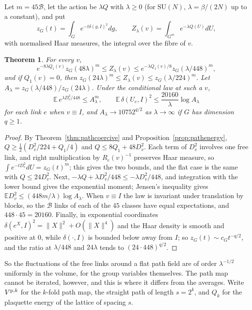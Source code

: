 \documentclass[11pt]{amsart}
\newtheorem{theorem}{Theorem}[section]
\theoremstyle{definition}
\theoremstyle{remark}
\numberwithin{equation}{section}
\newcommand{\E}{\mathbb{E}}
\newcommand{\SU}{\mathrm{SU}}
\begin{document}
Let $m=45\mathcal B$, let the action be $\lambda Q$ with $\lambda\ge0$
(for $\SU(N)$, $\lambda=\beta/(2N)$ up to a constant), and put
\[
z_G(t)=\int_Ge^{-t\delta(g,I)^2}dg,\qquad Z_\lambda(v)=\int_{G^m}
e^{-\lambda Q(U)}dU,
\]
with normalised Haar measures, the integral over the fibre of $v$.

\begin{theorem}\label{thm:pathZ}
For every $v$,
\[
e^{-8\lambda Q_1(v)}z_G(48\lambda)^m\le Z_\lambda(v)\le e^{-\lambda
Q_1(v)/8}z_G(\lambda/448)^m,
\]
and if $Q_1(v)=0$, then $z_G(24\lambda)^m\le Z_\lambda(v)\le z_G(\lambda/
224)^m$. Let $A_\lambda=z_G(\lambda/448)/z_G(24\lambda)$. Under the
conditional law at such a $v$,
\[
\E\,e^{\lambda D_v^2/448}\le A_\lambda^m,\qquad \E\,\delta(U_e,I)^2\le
\frac{20160}\lambda\log A_\lambda
\]
for each link $e$ when $v\equiv I$, and $A_\lambda\to10752^{q/2}$ as
$\lambda\to\infty$ if $G$ has dimension $q\ge1$.
\end{theorem}

\begin{proof}
By Theorem~\ref{thm:pathcoercive} and Proposition~\ref{prop:pathenergy},
$Q\ge\frac12(D_v^2/224+Q_1/4)$ and $Q\le8Q_1+48D_v^2$. Each term of
$D_v^2$ involves one free link, and right multiplication by $R_e(v)^{-1}$
preserves Haar measure, so $\int e^{-tD_v^2}dU=z_G(t)^m$; this gives the
two bounds, and the flat case is the same with $Q\le24D_v^2$. Next,
$-\lambda Q+\lambda D_v^2/448\le-\lambda D_v^2/448$, and integration with
the lower bound gives the exponential moment; Jensen's inequality gives
$\E D_v^2\le(448m/\lambda)\log A_\lambda$. When $v\equiv I$ the law is
invariant under translation by blocks, so the $\mathcal B$ links of each
of the $45$ classes have equal expectations, and $448\cdot45=20160$.
Finally, in exponential coordinates $\delta(e^X,I)^2=\lVert X\rVert^2+
O(\lVert X\rVert^4)$ and the Haar density is smooth and positive at $0$,
while $\delta(\cdot,I)$ is bounded below away from $I$; so $z_G(t)\sim c_G
t^{-q/2}$, and the ratio at $\lambda/448$ and $24\lambda$ tends to
$(24\cdot448)^{q/2}$.
\end{proof}

So the fluctuations of the free links around a flat path field are of
order $\lambda^{-1/2}$ uniformly in the volume, for the group variables
themselves. The path map cannot be iterated, however, and this is where it
differs from the averages. Write $V^{{\rm p},k}$ for the $k$-fold path map,
the straight path of length $s=2^k$, and $Q_k$ for the plaquette energy of
the lattice of spacing $s$.
\end{document}
